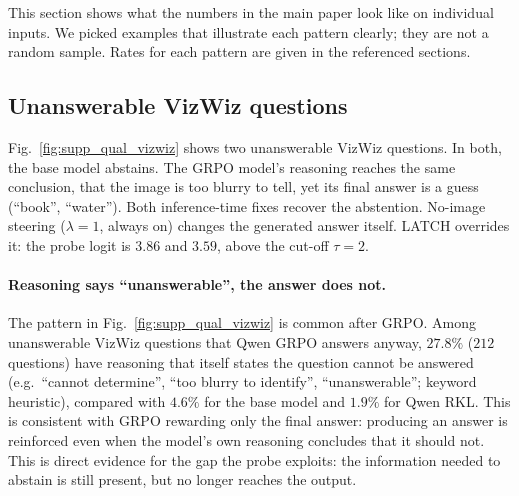 This section shows what the numbers in the main paper look like on individual inputs. We
picked examples that illustrate each pattern clearly; they are not a random sample. Rates
for each pattern are given in the referenced sections.

\subsection{Unanswerable VizWiz questions}
\label{sec:supp_qual_vizwiz}

Fig.~\ref{fig:supp_qual_vizwiz} shows two unanswerable VizWiz questions. In both, the base
model abstains. The GRPO model's reasoning reaches the same conclusion, that the image is
too blurry to tell, yet its final answer is a guess (``book'', ``water''). Both inference-time
fixes recover the abstention. No-image steering ($\lambda{=}1$, always on) changes the
generated answer itself. LATCH overrides it: the probe logit is $3.86$ and $3.59$,
above the cut-off $\tau{=}2$.

\paragraph{Reasoning says ``unanswerable'', the answer does not.}
The pattern in Fig.~\ref{fig:supp_qual_vizwiz} is common after GRPO. Among unanswerable
VizWiz questions that Qwen GRPO answers anyway, $27.8\%$ ($212$ questions) have reasoning
that itself states the question cannot be answered (e.g.\ ``cannot determine'', ``too blurry
to identify'', ``unanswerable''; keyword heuristic), compared with $4.6\%$ for the base
model and $1.9\%$ for Qwen RKL. This is consistent with GRPO rewarding only the final
answer: producing an answer is reinforced even when the model's own reasoning concludes that
it should not. This is direct evidence for the gap the probe exploits: the information
needed to abstain is still present, but no longer reaches the output.

